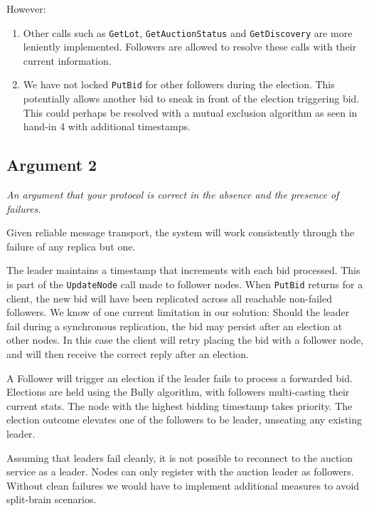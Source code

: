 \documentclass[a4paper,11pt]{article}
\begin{document}
\noindent However:

\begin{enumerate}
    \item Other calls such as \texttt{GetLot}, \texttt{GetAuctionStatus} and \texttt{GetDiscovery} are more leniently implemented. Followers are allowed to resolve these calls with their current information. 
    \item We have not locked \texttt{PutBid} for other followers during the election. This potentially allows another bid to sneak in front of the election triggering bid. This could perhaps be resolved with a mutual exclusion algorithm as seen in hand-in 4 with additional timestamps. 
\end{enumerate}

\subsection{Argument 2}

\textit{An argument that your protocol is correct in the absence and the presence of failures.}

\bigbreak

Given reliable message transport, the system will work consistently through the failure of any replica but one. 

\bigbreak

The leader maintains a timestamp that increments with each bid processed. This is part of the \texttt{UpdateNode} call made to follower nodes. When \texttt{PutBid} returns for a client, the new bid will have been replicated across all reachable non-failed followers. We know of one current limitation in our solution: Should the leader fail during a synchronous replication, the bid may persist after an election at other nodes. In this case the client will retry placing the bid with a follower node, and will then receive the correct reply after an election. 

\bigbreak

A Follower will trigger an election if the leader fails to process a forwarded bid. Elections are held using the Bully algorithm, with followers multi-casting their current stats. The node with the highest bidding timestamp takes priority. The election outcome elevates one of the followers to be leader, unseating any existing leader. 

\bigbreak

Assuming that leaders fail cleanly, it is not possible to reconnect to the auction service as a leader. Nodes can only register with the auction leader as followers. Without clean failures we would have to implement additional measures to avoid split-brain scenarios. 
\end{document}
